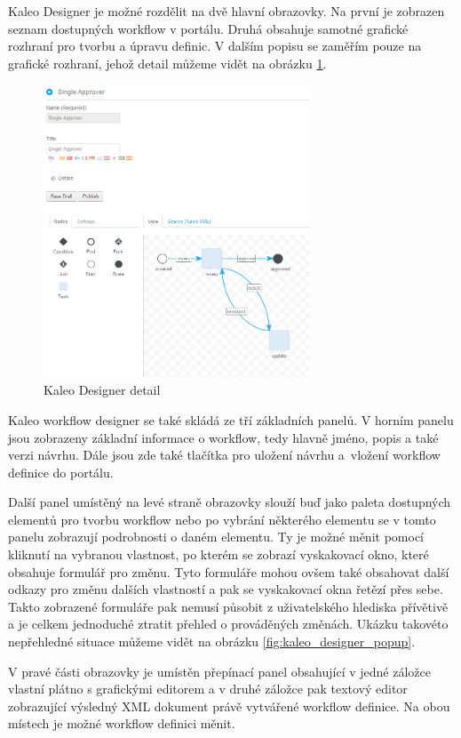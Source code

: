 \documentclass{fithesis}
\begin{document}
Kaleo Designer je možné rozdělit na dvě hlavní obrazovky. Na první je zobrazen seznam dostupných workflow v portálu. Druhá obsahuje samotné grafické rozhraní pro tvorbu a úpravu definic. V dalším popisu se zaměřím pouze na grafické rozhraní, jehož detail můžeme vidět na obrázku \ref{fig:kaleo_designer}.

\begin{figure}[h]
\centering
\includegraphics[width=300px]{images/kaleo_designer_detail.png}
\caption{Kaleo Designer detail}
\label{fig:kaleo_designer}
\end{figure}

Kaleo workflow designer se také skládá ze tří základních panelů. V horním panelu jsou zobrazeny základní informace o workflow, tedy hlavně jméno, popis a také verzi návrhu. Dále jsou zde také tlačítka pro uložení návrhu a~vložení workflow definice do portálu.

Další panel umístěný na levé straně obrazovky slouží buď jako paleta dostupných elementů pro tvorbu workflow nebo po vybrání některého elementu se v tomto panelu zobrazují podrobnosti o daném elementu. Ty je možné měnit pomocí kliknutí na vybranou vlastnost, po kterém se zobrazí vyskakovací okno, které obsahuje formulář pro změnu. Tyto formuláře mohou ovšem také obsahovat další odkazy pro změnu dalších vlastností a pak se vyskakovací okna řetězí přes sebe.  Takto zobrazené formuláře pak nemusí působit z uživatelského hlediska přívětivě a je celkem jednoduché ztratit přehled o prováděných změnách. Ukázku takovéto nepřehledné situace můžeme vidět na obrázku \ref{fig:kaleo_designer_popup}.  

V pravé části obrazovky je umístěn přepínací panel obsahující v jedné záložce vlastní plátno s grafickými editorem a v druhé záložce pak textový editor zobrazující výsledný XML dokument právě vytvářené workflow definice. Na obou místech je možné workflow definici měnit.
\end{document}
